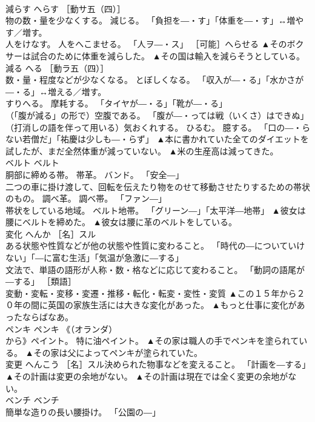 \documentclass[8pt]{extreport}
\begin{document}
\begin{CJK}{UTF8}{min}
\\	減らす	へらす	［動サ五（四）］ 
\\	物の数・量を少なくする。 減じる。 「負担を―・す」「体重を―・す」↔増やす／増す。 
\\	人をけなす。 人をへこませる。 「人ヲ―・ス」 ［可能］へらせる	▲そのボクサーは試合のために体重を減らした。 ▲その国は輸入を減らそうとしている。
\\	減る	へる	［動ラ五（四）］ 
\\	数・量・程度などが少なくなる。 とぼしくなる。 「収入が―・る」「水かさが―・る」↔増える／増す。 
\\	すりへる。 摩耗する。 「タイヤが―・る」「靴が―・る」 
\\	（「腹が減る」の形で）空腹である。 「腹が―・っては戦（いくさ）はできぬ」 
\\	（打消しの語を伴って用いる）気おくれする。 ひるむ。 臆する。 「口の―・らない若僧だ」「祐慶は少しも―・らず」	▲本に書かれていた全てのダイエットを試したが、まだ全然体重が減っていない。 ▲米の生産高は減ってきた。
\\	ベルト	ベルト	
\\	胴部に締める帯。 帯革。 バンド。 「安全―」 
\\	二つの車に掛け渡して、回転を伝えたり物をのせて移動させたりするための帯状のもの。 調べ革。 調べ帯。 「ファン―」 
\\	帯状をしている地域。 ベルト地帯。 「グリーン―」「太平洋―地帯」	▲彼女は腰にベルトを締めた。 ▲彼女は腰に革のベルトをしている。
\\	変化	へんか	［名］スル 
\\	ある状態や性質などが他の状態や性質に変わること。 「時代の―についていけない」「―に富む生活」「気温が急激に―する」 
\\	文法で、単語の語形が人称・数・格などに応じて変わること。 「動詞の語尾が―する」 ［類語］
\\	変動・変転・変移・変遷・推移・転化・転変・変性・変質	▲この１５年から２０年の間に英国の家族生活には大きな変化があった。 ▲もっと仕事に変化があったならばなあ。
\\	ペンキ	ペンキ	《（オランダ）
\\	から》ペイント。 特に油ペイント。	▲その家は職人の手でペンキを塗られている。 ▲その家は父によってペンキが塗られていた。
\\	変更	へんこう	［名］スル決められた物事などを変えること。 「計画を―する」	▲その計画は変更の余地がない。 ▲その計画は現在では全く変更の余地がない。
\\	ベンチ	ベンチ	
\\	簡単な造りの長い腰掛け。 「公園の―」 

\end{CJK}
\end{document}
